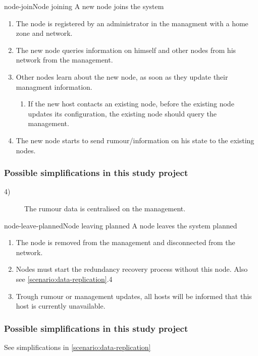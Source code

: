 \begin{scenario}{node-join}{Node joining}
    A new node joins the system
    
    \begin{enumerate}
    	\item The node is registered by an administrator in the managment with a home zone and network.
    	\item The new node queries information on himself and other nodes from his network from the management.
    	\item Other nodes learn about the new node, as soon as they update their managment information.
    		\begin{enumerate}
    			\item If the new host contacts an existing node, before the existing node updates its configuration, the existing node should query the management.
    		\end{enumerate}
    	\item The new node starts to send rumour/information on his state to the existing nodes.
    \end{enumerate}
    
	\subsubsection{Possible simplifications in this study project}
	\begin{description}
		 \item[4)] The rumour data is centralised on the management.
	\end{description}
\end{scenario}

\begin{scenario}{node-leave-planned}{Node leaving planned}
    A node leaves the system planned
    \begin{enumerate}
    	\item The node is removed from the management and disconnected from the network.
    	\item Nodes must start the redundancy recovery process without this node.
    		Also see \ref{scenario:data-replication}.4
    	\item Trough rumour or management updates, all hosts will be informed that this host is currently unavailable.
    \end{enumerate}
    
	\subsubsection{Possible simplifications in this study project}
		See simplifications in \ref{scenario:data-replication}
\end{scenario}

